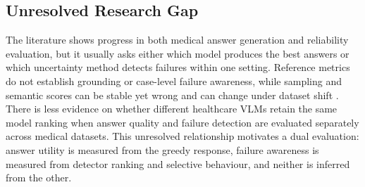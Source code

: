 \subsection{Unresolved Research Gap}

The literature shows progress in both medical answer generation and reliability evaluation, but it usually asks either which model produces the best answers or which uncertainty method detects failures within one setting. Reference metrics do not establish grounding or case-level failure awareness, while sampling and semantic scores can be stable yet wrong and can change under dataset shift \citep{farquhar2024semanticentropy,carlini2026qasnne,ovadia2019uncertainty}. There is less evidence on whether different healthcare VLMs retain the same model ranking when answer quality and failure detection are evaluated separately across medical datasets. This unresolved relationship motivates a dual evaluation: answer utility is measured from the greedy response, failure awareness is measured from detector ranking and selective behaviour, and neither is inferred from the other.
